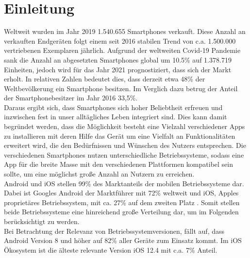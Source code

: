 \chapter{Einleitung}

Weltweit wurden im Jahr 2019 1.540.655 Smartphones verkauft. Diese Anzahl an verkauften Endgeräten folgt einem seit 2016 stabilen Trend von c.a. 1.500.000 vertriebenen Exemplaren jährlich. Aufgrund der weltweiten Covid-19 Pandemie sank die Anzahl an abgesetzten Smartphones global um 10.5\% auf 1.378.719 Einheiten, jedoch wird für das Jahr 2021 prognostiziert, dass sich der Markt erholt\cite{statista2_sales}\cite{gartner_sales}. In relativen Zahlen bedeutet dies, dass derzeit etwa 48\% der Weltbevölkerung ein Smartphone besitzen. Im Verglich dazu betrug der Anteil der Smartphonebesitzer im Jahr 2016 33,5\%\cite{bankmycell}.\\

Daraus ergibt sich, dass Smartphones sich hoher Beliebtheit erfreuen und inzwischen fest in unser alltägliches Leben integriert sind. Dies kann damit begründet werden, dass die Möglichkeit besteht eine Vielzahl verschiedener Apps zu installieren mit deren Hilfe das Gerät um eine Vielfalt an Funktionalitäten erweitert wird, die den Bedürfnissen und Wünschen des Nutzers entsprechen. Die verschiedenen Smartphones nutzen unterschiedliche Betriebssysteme, sodass eine App für die breite Masse mit den verschiedenen Plattformen kompatibel sein sollte, um eine möglichst große Anzahl an Nutzern zu erreichen.\\

Android und iOS stellen 99\% des Marktanteils der mobilen Betriebssysteme dar. Dabei ist Googles Android der Marktführer mit 72\% weltweit und iOS, Apples proprietäres Betriebssystem, mit ca. 27\% auf dem zweiten Platz \cite{stat1}. Somit stellen beide Betriebssysteme eine hinreichend große Verteilung dar, um im Folgenden berücksichtigt zu werden.\\

Bei Betrachtung der Relevanz von Betriebssystemversionen, fällt auf, dass Android Version 8 und höher auf 82\% aller Geräte zum Einsatz kommt. Im iOS Ökosystem ist die älteste relevante Version iOS 12.4 mit c.a. 7\% Anteil\cite{stat3}\cite{stat4}.\\

\newpage

